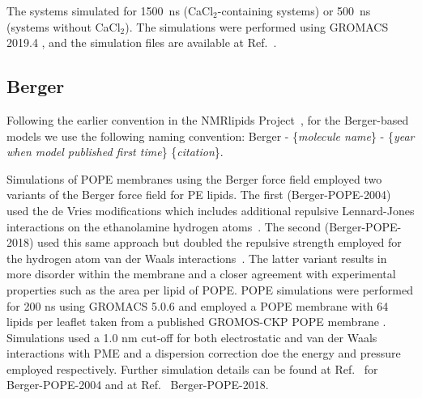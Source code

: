\documentclass[journal=jpcbfk]{achemso}
\begin{document}
The systems simulated for 1500~ns (CaCl$_2$-containing systems) or 500~ns (systems without CaCl$_2$). The simulations were performed using GROMACS 2019.4 \cite{abraham2015gromacs}, and the simulation files are available at Ref.~.

\subsection{Berger}

Following the earlier convention in the NMRlipids Project~\cite{botan15}, 
for the Berger-based models we use the following naming convention: 
Berger - \{{\it molecule name}\} - \{{\it year when model published first time}\} \{{\it citation}\}.

Simulations of POPE membranes using the Berger force field employed two variants of the Berger force field for PE lipids. The first (Berger-POPE-2004) used the de Vries modifications which includes additional repulsive Lennard-Jones interactions on the ethanolamine hydrogen atoms~\cite{devries04}. The second (Berger-POPE-2018) used this same approach but doubled the repulsive strength employed for the hydrogen atom van der Waals interactions~\cite{berger2POPEfiles}. The latter variant results in more disorder within the membrane and a closer agreement with experimental properties such as the area per lipid of POPE. POPE simulations were performed for 200 ns using GROMACS 5.0.6 and employed a POPE membrane with 64 lipids per leaflet taken from a published GROMOS-CKP POPE membrane \cite{piggot11}. Simulations used a 1.0 nm cut-off for both electrostatic and van der Waals interactions with PME and a dispersion correction doe the energy and pressure employed respectively. Further simulation details can be found at Ref.~ for Berger-POPE-2004 and at Ref.~ Berger-POPE-2018.

\end{document}
